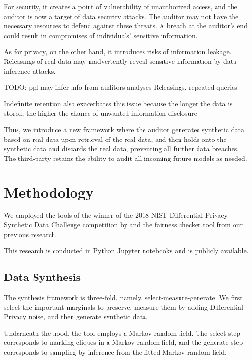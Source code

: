\documentclass[manuscript,screen,review,anonymous]{acmart}
\begin{document}
For security, it creates a point of vulnerability of unauthorized access, and the auditor is now a target of data security attacks. The auditor may not have the necessary resources to defend against these threats. A breach at the auditor's end could result in compromises of individuals' sensitive information.

As for privacy, on the other hand, it introduces risks of information leakage. Releasings of real data may inadvertently reveal sensitive information by data inference attacks.

TODO: ppl may infer info from auditors analyses Releasings. repeated queries

Indefinite retention also exacerbates this issue because the longer the data is stored, the higher the chance of unwanted information disclosure.

Thus, we introduce a new framework where the auditor generates synthetic data based on real data upon retrieval of the real data, and then holds onto the synthetic data and discards the real data, preventing all further data breaches. The third-party retains the ability to audit all incoming future models as needed.

\section{Methodology}
\label{sec:method}

We employed the tools of the winner of the 2018 NIST Differential Privacy Synthetic Data Challenge competition\cite{NIST2018} by \cite{McKenna_Private-PGM_2021,mckenna2021winning,mckenna2019graphical} and the fairness checker tool from our previous research\cite{yuan2024ensuring}.

This research is conducted in Python Jupyter notebooks and is publicly available.

\subsection{Data Synthesis}

The synthesis framework is three-fold, namely, select-measure-generate\cite{McKenna2022,YouTube_Differentially_Private_Synthetic_Data}. We first select the important marginals to preserve, measure them by adding Differential Privacy noise, and then generate synthetic data.

Underneath the hood, the tool employs a Markov random field. The select step corresponds to marking cliques in a Markov random field, and the generate step corresponds to sampling by inference from the fitted Markov random field.
\end{document}
